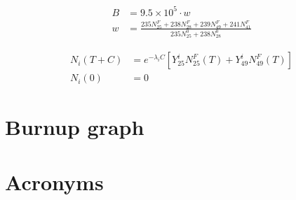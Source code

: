 \documentclass[11pt,a4paper]{article}
\newcommand{\acs}{\acrshort} %
\begin{document}
\begin{appendices}
    \begin{equation}
        \begin{aligned}
            B &= 9.5 \times 10^5 \cdot w
            \\
            w &= \frac{235N^F_{25} + 238N^F_{28} + 239N^F_{49} + 241N^F_{41}}{235N^0_{25} +  238N^0_{28}}
        \end{aligned}
    \end{equation}

    \begin{equation}
        \begin{aligned}
            N_i(T + C) &= e^{-\lambda_iC}[Y_{25}^iN_{25}^F(T) + Y_{49}^iN_{49}^F(T)]
            \\
            N_i(0) &= 0
        \end{aligned}
    \end{equation}

\newpage

    \section{Burnup graph} \label{app-burnup}
    




\newpage


    \section{Acronyms}
    \printnoidxglossary[title={}]


\end{appendices}
\end{document}
